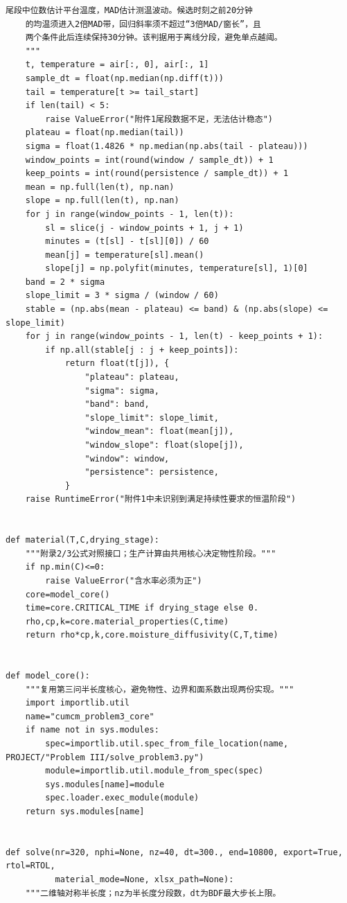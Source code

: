 \documentclass[12pt,a4paper]{ctexart}
\begin{document}
\begin{lstlisting}[caption={solve\_result2.py }]
    尾段中位数估计平台温度，MAD估计测温波动。候选时刻之前20分钟
    的均温须进入2倍MAD带，回归斜率须不超过“3倍MAD/窗长”，且
    两个条件此后连续保持30分钟。该判据用于离线分段，避免单点越阈。
    """
    t, temperature = air[:, 0], air[:, 1]
    sample_dt = float(np.median(np.diff(t)))
    tail = temperature[t >= tail_start]
    if len(tail) < 5:
        raise ValueError("附件1尾段数据不足，无法估计稳态")
    plateau = float(np.median(tail))
    sigma = float(1.4826 * np.median(np.abs(tail - plateau)))
    window_points = int(round(window / sample_dt)) + 1
    keep_points = int(round(persistence / sample_dt)) + 1
    mean = np.full(len(t), np.nan)
    slope = np.full(len(t), np.nan)
    for j in range(window_points - 1, len(t)):
        sl = slice(j - window_points + 1, j + 1)
        minutes = (t[sl] - t[sl][0]) / 60
        mean[j] = temperature[sl].mean()
        slope[j] = np.polyfit(minutes, temperature[sl], 1)[0]
    band = 2 * sigma
    slope_limit = 3 * sigma / (window / 60)
    stable = (np.abs(mean - plateau) <= band) & (np.abs(slope) <= slope_limit)
    for j in range(window_points - 1, len(t) - keep_points + 1):
        if np.all(stable[j : j + keep_points]):
            return float(t[j]), {
                "plateau": plateau,
                "sigma": sigma,
                "band": band,
                "slope_limit": slope_limit,
                "window_mean": float(mean[j]),
                "window_slope": float(slope[j]),
                "window": window,
                "persistence": persistence,
            }
    raise RuntimeError("附件1中未识别到满足持续性要求的恒温阶段")


def material(T,C,drying_stage):
    """附录2/3公式对照接口；生产计算由共用核心决定物性阶段。"""
    if np.min(C)<=0:
        raise ValueError("含水率必须为正")
    core=model_core()
    time=core.CRITICAL_TIME if drying_stage else 0.
    rho,cp,k=core.material_properties(C,time)
    return rho*cp,k,core.moisture_diffusivity(C,T,time)


def model_core():
    """复用第三问半长度核心，避免物性、边界和面系数出现两份实现。"""
    import importlib.util
    name="cumcm_problem3_core"
    if name not in sys.modules:
        spec=importlib.util.spec_from_file_location(name, PROJECT/"Problem III/solve_problem3.py")
        module=importlib.util.module_from_spec(spec)
        sys.modules[name]=module
        spec.loader.exec_module(module)
    return sys.modules[name]


def solve(nr=320, nphi=None, nz=40, dt=300., end=10800, export=True, rtol=RTOL,
          material_mode=None, xlsx_path=None):
    """二维轴对称半长度；nz为半长度分段数，dt为BDF最大步长上限。


\end{lstlisting}
\end{document}
